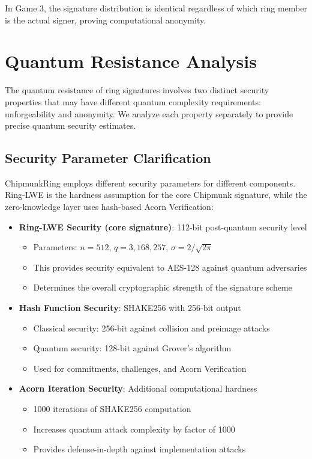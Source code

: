 \documentclass[11pt,a4paper]{article}
\begin{document}
In Game 3, the signature distribution is identical regardless of which ring member is the actual signer, proving computational anonymity.

\section{Quantum Resistance Analysis}

The quantum resistance of ring signatures involves two distinct security properties that may have different quantum complexity requirements: unforgeability and anonymity. We analyze each property separately to provide precise quantum security estimates.

\subsection{Security Parameter Clarification}

ChipmunkRing employs different security parameters for different components. Ring-LWE is the hardness assumption for the core Chipmunk signature, while the zero-knowledge layer uses hash-based Acorn Verification:

\begin{itemize}
\item \textbf{Ring-LWE Security (core signature)}: 112-bit post-quantum security level
   \begin{itemize}
   \item Parameters: $n = 512$, $q = 3,168,257$, $\sigma = 2/\sqrt{2\pi}$
   \item This provides security equivalent to AES-128 against quantum adversaries
   \item Determines the overall cryptographic strength of the signature scheme
   \end{itemize}
   
\item \textbf{Hash Function Security}: SHAKE256 \cite{sha3-2015, bertoni2013} with 256-bit output
   \begin{itemize}
   \item Classical security: 256-bit against collision and preimage attacks
   \item Quantum security: 128-bit against Grover's algorithm \cite{grover1996}
   \item Used for commitments, challenges, and Acorn Verification
   \end{itemize}
   
\item \textbf{Acorn Iteration Security}: Additional computational hardness
   \begin{itemize}
   \item 1000 iterations of SHAKE256 computation
   \item Increases quantum attack complexity by factor of 1000
   \item Provides defense-in-depth against implementation attacks
   \end{itemize}
\end{itemize}
\end{document}
